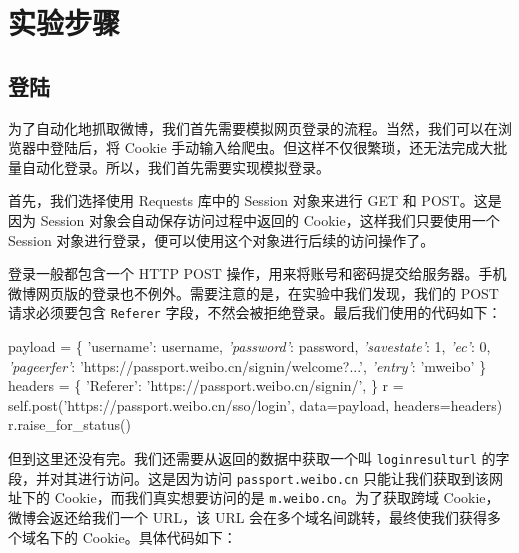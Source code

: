 \documentclass[a4paper,UTF8]{ctexart}
\newenvironment{Shaded}{}{}
\newcommand{\DecValTok}[1]{\textcolor[rgb]{0.25,0.63,0.44}{{#1}}}
\newcommand{\StringTok}[1]{\textcolor[rgb]{0.25,0.44,0.63}{{#1}}}
\newcommand{\CommentTok}[1]{\textcolor[rgb]{0.38,0.63,0.69}{\textit{{#1}}}}
\newcommand{\VariableTok}[1]{\textcolor[rgb]{0.10,0.09,0.49}{{#1}}}
\newcommand{\OperatorTok}[1]{\textcolor[rgb]{0.40,0.40,0.40}{{#1}}}
\newcommand{\NormalTok}[1]{{#1}}
\begin{document}
\section{实验步骤}\label{ux5b9eux9a8cux6b65ux9aa4}

\subsection{登陆}\label{ux767bux9646}

为了自动化地抓取微博，我们首先需要模拟网页登录的流程。当然，我们可以在浏览器中登陆后，将
Cookie
手动输入给爬虫。但这样不仅很繁琐，还无法完成大批量自动化登录。所以，我们首先需要实现模拟登录。

首先，我们选择使用 Requests 库中的 Session 对象来进行 GET 和
POST。这是因为 Session 对象会自动保存访问过程中返回的
Cookie，这样我们只要使用一个 Session
对象进行登录，便可以使用这个对象进行后续的访问操作了。

登录一般都包含一个 HTTP POST
操作，用来将账号和密码提交给服务器。手机微博网页版的登录也不例外。需要注意的是，在实验中我们发现，我们的
POST 请求必须要包含 \texttt{Referer}
字段，不然会被拒绝登录。最后我们使用的代码如下：

\begin{Shaded}
\begin{Highlighting}[]
\NormalTok{payload }\OperatorTok{=} \NormalTok{\{}
    \StringTok{'username'}\NormalTok{: username,}
    \CommentTok{'password'}\NormalTok{: password,}
    \CommentTok{'savestate'}\NormalTok{: }\DecValTok{1}\NormalTok{,}
    \CommentTok{'ec'}\NormalTok{: }\DecValTok{0}\NormalTok{,}
    \CommentTok{'pageerfer'}\NormalTok{: }\StringTok{'https://passport.weibo.cn/signin/welcome?...'}\NormalTok{,}
    \CommentTok{'entry'}\NormalTok{: }\StringTok{'mweibo'}
\NormalTok{\}}
\NormalTok{headers }\OperatorTok{=} \NormalTok{\{}
    \StringTok{'Referer'}\NormalTok{: }\StringTok{'https://passport.weibo.cn/signin/'}\NormalTok{,}
\NormalTok{\}}
\NormalTok{r }\OperatorTok{=} \VariableTok{self}\NormalTok{.post(}\StringTok{'https://passport.weibo.cn/sso/login'}\NormalTok{,}
              \NormalTok{data}\OperatorTok{=}\NormalTok{payload, headers}\OperatorTok{=}\NormalTok{headers)}
\NormalTok{r.raise_for_status()}
\end{Highlighting}
\end{Shaded}

但到这里还没有完。我们还需要从返回的数据中获取一个叫
\texttt{loginresulturl} 的字段，并对其进行访问。这是因为访问
\texttt{passport.weibo.cn} 只能让我们获取到该网址下的
Cookie，而我们真实想要访问的是 \texttt{m.weibo.cn}。为了获取跨域
Cookie，微博会返还给我们一个 URL，该 URL
会在多个域名间跳转，最终使我们获得多个域名下的 Cookie。具体代码如下：
\end{document}
